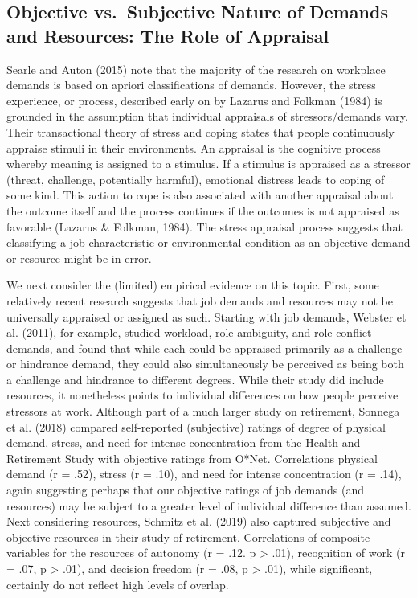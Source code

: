 \documentclass[
  english,
  man]{apa6}
\begin{document}
\hypertarget{objective-vs.-subjective-nature-of-demands-and-resources-the-role-of-appraisal}{%
\subsection{Objective vs.~Subjective Nature of Demands and Resources: The Role of Appraisal}\label{objective-vs.-subjective-nature-of-demands-and-resources-the-role-of-appraisal}}

Searle and Auton (2015) note that the majority of the research on workplace demands is based on apriori classifications of demands. However, the stress experience, or process, described early on by Lazarus and Folkman (1984) is grounded in the assumption that individual appraisals of stressors/demands vary. Their transactional theory of stress and coping states that people continuously appraise stimuli in their environments. An appraisal is the cognitive process whereby meaning is assigned to a stimulus. If a stimulus is appraised as a stressor (threat, challenge, potentially harmful), emotional distress leads to coping of some kind. This action to cope is also associated with another appraisal about the outcome itself and the process continues if the outcomes is not appraised as favorable (Lazarus \& Folkman, 1984). The stress appraisal process suggests that classifying a job characteristic or environmental condition as an objective demand or resource might be in error.

We next consider the (limited) empirical evidence on this topic. First, some relatively recent research suggests that job demands and resources may not be universally appraised or assigned as such. Starting with job demands, Webster et al. (2011), for example, studied workload, role ambiguity, and role conflict demands, and found that while each could be appraised primarily as a challenge or hindrance demand, they could also simultaneously be perceived as being both a challenge and hindrance to different degrees. While their study did include resources, it nonetheless points to individual differences on how people perceive stressors at work. Although part of a much larger study on retirement, Sonnega et al. (2018) compared self-reported (subjective) ratings of degree of physical demand, stress, and need for intense concentration from the Health and Retirement Study with objective ratings from O*Net. Correlations physical demand (r = .52), stress (r = .10), and need for intense concentration (r = .14), again suggesting perhaps that our objective ratings of job demands (and resources) may be subject to a greater level of individual difference than assumed. Next considering resources, Schmitz et al. (2019) also captured subjective and objective resources in their study of retirement. Correlations of composite variables for the resources of autonomy (r = .12. p \textgreater{} .01), recognition of work (r = .07, p \textgreater{} .01), and decision freedom (r = .08, p \textgreater{} .01), while significant, certainly do not reflect high levels of overlap.
\end{document}
